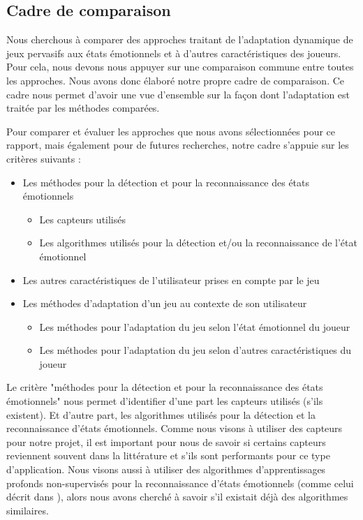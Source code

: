 \documentclass[11pt]{article}
\begin{document}
	\subsection{Cadre de comparaison}\label{sec:edacadre}
		Nous cherchous à comparer des approches traitant de l'adaptation dynamique de jeux pervasifs aux états émotionnels et à d'autres caractéristiques des joueurs.
		Pour cela, nous devons nous appuyer sur une comparaison commune entre toutes les approches.
		Nous avons donc élaboré notre propre cadre de comparaison. 
		Ce cadre nous permet d'avoir une vue d'ensemble sur la façon dont l'adaptation est traitée par les méthodes comparées.\par
		Pour comparer et évaluer les approches que nous avons sélectionnées pour ce rapport, mais également pour de futures recherches, notre cadre s'appuie sur les critères suivants :
		\begin{itemize}
			\item Les méthodes pour la détection et pour la reconnaissance des états émotionnels
			\begin{itemize}
				\item Les capteurs utilisés
				\item Les algorithmes utilisés pour la détection et/ou la reconnaissance de l'état émotionnel
			\end{itemize}
			\item Les autres caractéristiques de l'utilisateur prises en compte par le jeu
			\item Les méthodes d'adaptation d'un jeu au contexte de son utilisateur
			\begin{itemize}
				\item Les méthodes pour l'adaptation du jeu selon l'état émotionnel du joueur
				\item Les méthodes pour l'adaptation du jeu selon d'autres caractéristiques du joueur
			\end{itemize}
		\end{itemize}\par
		Le critère "méthodes pour la détection et pour la reconnaissance des états émotionnels" nous permet d'identifier d'une part les capteurs utilisés (s'ils existent).
		Et d'autre part, les algorithmes utilisés pour la détection et la reconnaissance d'états émotionnels.
		Comme nous visons à utiliser des capteurs pour notre projet, il est important pour nous de savoir si certains capteurs reviennent souvent dans la littérature et s'ils sont performants pour ce type d'application.
		Nous visons aussi à utiliser des algorithmes d'apprentissages profonds non-supervisés pour la reconnaissance d'états émotionnels (comme celui décrit dans \cite{gal_et_al._2020}), alors nous avons cherché à savoir s'il existait déjà des algorithmes similaires.\par
\end{document}

